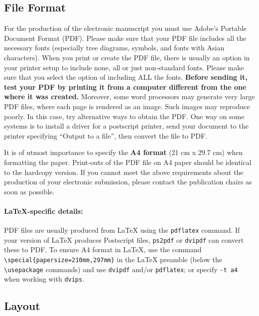 \documentclass[11pt,a4paper]{article}
\begin{document}
\subsection{File Format}
\label{sect:pdf}

For the production of the electronic manuscript you must use Adobe's Portable Document Format (PDF).
Please make sure that your PDF file includes all the necessary fonts (especially tree diagrams, symbols, and fonts with Asian characters).
When you print or create the PDF file, there is usually an option in your printer setup to include none, all or just non-standard fonts.
Please make sure that you select the option of including ALL the fonts.
\textbf{Before sending it, test your PDF by printing it from a computer different from the one where it was created.}
Moreover, some word processors may generate very large PDF files, where each page is rendered as an image.
Such images may reproduce poorly.
In this case, try alternative ways to obtain the PDF.
One way on some systems is to install a driver for a postscript printer, send your document to the printer specifying ``Output to a file'', then convert the file to PDF.

It is of utmost importance to specify the \textbf{A4 format} (21 cm x 29.7 cm) when formatting the paper.
Print-outs of the PDF file on A4 paper should be identical to the hardcopy version.
If you cannot meet the above requirements about the production of your electronic submission, please contact the publication chairs as soon as possible.

\paragraph{\LaTeX-specific details:}
PDF files are usually produced from \LaTeX{} using the \texttt{\small pdflatex} command.
If your version of \LaTeX{} produces Postscript files, \texttt{\small ps2pdf} or \texttt{\small dvipdf} can convert these to PDF.
To ensure A4 format in \LaTeX, use the command {\small\verb|\special{papersize=210mm,297mm}|}
in the \LaTeX{} preamble (below the {\small\verb|\usepackage|} commands) and use \texttt{\small dvipdf} and/or \texttt{\small pdflatex}; or specify \texttt{\small -t a4} when working with \texttt{\small dvips}.

\subsection{Layout}
\label{ssec:layout}
\end{document}
